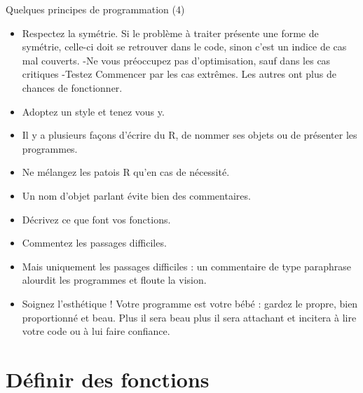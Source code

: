 \documentclass[
  ignorenonframetext,
]{beamer}
\begin{document}
\begin{frame}{Quelques principes de programmation (4)}
\protect\hypertarget{quelques-principes-de-programmation-4}{}
\begin{itemize}
\item
  Respectez la symétrie. Si le problème à traiter présente une forme de
  symétrie, celle-ci doit se retrouver dans le code, sinon c'est un
  indice de cas mal couverts. -Ne vous préoccupez pas d'optimisation,
  sauf dans les cas critiques -Testez Commencer par les cas extrêmes.
  Les autres ont plus de chances de fonctionner.
\item
  Adoptez un style et tenez vous y.
\item
  Il y a plusieurs façons d'écrire du R, de nommer ses objets ou de
  présenter les programmes.
\item
  Ne mélangez les patois R qu'en cas de nécessité.
\item
  Un nom d'objet parlant évite bien des commentaires.
\item
  Décrivez ce que font vos fonctions.
\item
  Commentez les passages difficiles.
\item
  Mais uniquement les passages difficiles : un commentaire de type
  paraphrase alourdit les programmes et floute la vision.
\item
  Soignez l'esthétique ! Votre programme est votre bébé : gardez le
  propre, bien proportionné et beau. Plus il sera beau plus il sera
  attachant et incitera à lire votre code ou à lui faire confiance.
\end{itemize}
\end{frame}

\hypertarget{duxe9finir-des-fonctions}{%
\section{Définir des fonctions}\label{duxe9finir-des-fonctions}}
\end{document}

